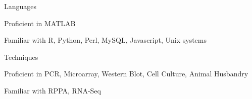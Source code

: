 \begin{cventries}
  \cventry
	{Languages}
    {}
	{}
    {}
    {
      \begin{cvitems}
        \item {Proficient in MATLAB }
        \item {Familiar with R, Python, Perl, MySQL, Javascript, Unix systems }
      \end{cvitems}
    }
  \cventry
	{Techniques}
    {}
	{}
    {}
    {
      \begin{cvitems}
        \item {Proficient in PCR, Microarray, Western Blot, Cell Culture, Animal Husbandry }
        \item {Familiar with RPPA, RNA-Seq }
      \end{cvitems}
    }
  
\end{cventries}
